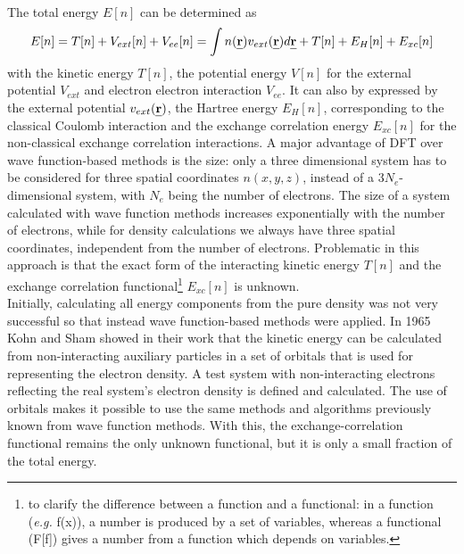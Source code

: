 \documentclass[11pt,DIV=13,BCOR=5mm,a4paper,headinclude]{scrbook}
\def\mathbi#1{\textbf{\em #1}}
\renewcommand{\vec}[1]{\mathbi{#1}}
\begin{document}
\\
The total energy $E[n]$ can be determined as
\begin{equation}
 E[n]=T[n] + V_{ext}[n] + V_{ee}[n]=\int n(\vec{r})v_{ext}(\vec{r})d\vec{r} + T[n]+E_H[n]+E_{xc}[n]
\end{equation}
with the kinetic energy $T[n]$, the potential energy $V[n]$ for the external potential $V_{ext}$ and electron electron interaction $V_{ee}$.
It can also by expressed by the external potential $v_{ext}(\vec{r})$, the Hartree energy $E_H[n]$, corresponding to the classical Coulomb interaction and the exchange correlation energy $E_{xc}[n]$ for the non-classical exchange correlation interactions.
A major advantage of DFT over wave function-based methods is the size: only a three dimensional system has to be considered for three spatial coordinates $n(x,y,z)$, instead of a $3N_e$-dimensional system, %
with $N_e$ being the number of electrons.
The size of a system calculated with wave function methods increases exponentially with the number of electrons, while for density calculations we always have three spatial coordinates, independent from the number of electrons.
Problematic in this approach is that the exact form of the interacting kinetic energy $T[n]$ and the exchange correlation functional\footnote{to clarify the difference between a function and a functional: in a function (\textit{e.g.} f(x)), a number is produced by a set of variables, whereas a functional (F[f]) gives a number from a function which depends on variables.} $E_{xc}[n]$ is unknown.
\\
Initially, calculating all energy components from the pure density was not very successful so that instead wave function-based methods were applied.
In 1965 Kohn and Sham showed in their work\cite{Kohn-Sham1965} that the kinetic energy can be calculated from non-interacting auxiliary particles in a set of orbitals that is used for representing the electron density.
A test system with non-interacting electrons reflecting the real system's electron density is defined and calculated.
The use of orbitals makes it possible to use the same methods and algorithms previously known from wave function methods.
With this, the exchange-correlation functional remains the only unknown functional, but it is only a small fraction of the total energy.
\end{document}
